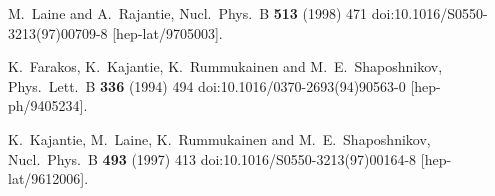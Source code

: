 \documentclass[11pt,a4paper]{article}
\begin{document}
\begin{thebibliography}{*}
  M.~Laine and A.~Rajantie,
  Nucl.\ Phys.\ B {\bf 513} (1998) 471
  doi:10.1016/S0550-3213(97)00709-8
  [hep-lat/9705003].


  K.~Farakos, K.~Kajantie, K.~Rummukainen and M.~E.~Shaposhnikov,
  Phys.\ Lett.\ B {\bf 336} (1994) 494
  doi:10.1016/0370-2693(94)90563-0
  [hep-ph/9405234].

  K.~Kajantie, M.~Laine, K.~Rummukainen and M.~E.~Shaposhnikov,
  Nucl.\ Phys.\ B {\bf 493} (1997) 413
  doi:10.1016/S0550-3213(97)00164-8
  [hep-lat/9612006].


\end{thebibliography}
\end{document}
